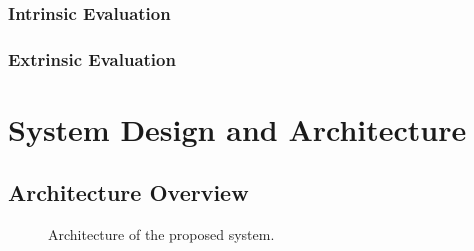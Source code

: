 \documentclass[11pt]{article}
\newif\ifguidance
\newcommand{\guidance}[1]{\ifguidance\textcolor{blue}{\small\textit{[#1]}}\fi}
\begin{document}
\begin{multicols}{2}
\guidance{%
  Review how systems like yours are typically evaluated. This motivates
  and justifies the evaluation approach you will describe later.}

\subsubsection{Intrinsic Evaluation}


\subsubsection{Extrinsic Evaluation}



\section{System Design and Architecture}
\label{sec:design}

\guidance{%
  MARKING: This section is worth 10 marks. The marker will check:
  (1) that each system component is clearly described and its inclusion
  is well motivated, and (2) that the overall design is coherent ---
  i.e.\ the components fit together logically. Include an architecture
  diagram. Explain \emph{why} you chose this design, not just
  \emph{what} it is.}

\subsection{Architecture Overview}

\guidance{%
  Provide a high-level overview of the full system. Reference your
  architecture diagram (Figure~\ref{fig:architecture}). Explain how
  data flows through the system from input to output.}

\begin{figure}[t]
  \centering
  \caption{Architecture of the proposed system.}
  \label{fig:architecture}
\end{figure}


\end{multicols}
\end{document}
